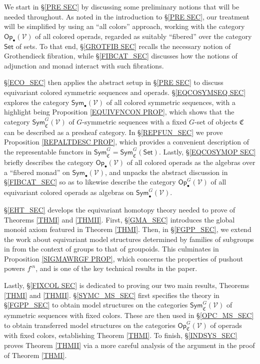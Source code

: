 \documentclass[a4paper,10pt
,draft
]{article}%
\numberwithin{equation}{section}
\numberwithin{figure}{section}
\theoremstyle{definition} %
\newcommand{\Op}{\mathsf{Op}}%
\newcommand{\V}{\ensuremath{\mathcal V}}
\newcommand{\1}{\ensuremath{\mathbbm 1}}%
\begin{document}
We start in \S \ref{PRE SEC} by discussing some preliminary notions that will be needed throughout.
As noted in the introduction to 
\S \ref{PRE SEC}, our treatment will be simplified by 
using an ``all colors'' approach,
working with the category $\Op_\bullet(\V)$ of all colored operads,
regarded as suitably ``fibered'' over the category $\mathsf{Set}$
of sets.
To that end, 
\S \ref{GROTFIB SEC} recalls the necessary
notion of Grothendieck fibration, 
while \S \ref{FIBCAT_SEC}
discusses how the notions of adjunction and monad 
interact with such fibrations.

\S \ref{ECO_SEC} then applies the abstract setup in \S \ref{PRE SEC}
to discuss equivariant colored symmetric sequences and operads. 
\S \ref{EQCOSYMSEQ SEC}
explores the category
$\mathsf{Sym}_{\bullet}(\V)$
of all colored symmetric sequences,
with a highlight being
Proposition \ref{EQUIVFNCON PROP},
which shows that the category
$\mathsf{Sym}^G_{\mathfrak{C}}(\V)$
of $G$-symmetric sequences with a fixed $G$-set of objects
$\mathfrak{C}$ can be described as a presheaf category.
In \S \ref{REPFUN_SEC} we prove
Proposition \ref{REPALTDESC PROP},
which provides a convenient description of the representable functors in 
$\mathsf{Sym}^G_{\mathfrak{C}} = \mathsf{Sym}^G_{\mathfrak{C}}(\mathsf{Set})$.
%
Lastly, \S \ref{EQCOSYMOP SEC}
briefly describes the category 
$\mathsf{Op}_{\bullet}(\V)$ 
of all colored operads as the algebras over a ``fibered monad''
on  
$\mathsf{Sym}_{\bullet}(\V)$,
and unpacks the abstract discussion in \S \ref{FIBCAT_SEC}
so as to likewise describe the category 
$\mathsf{Op}_{\bullet}^G(\V)$ 
of all equivariant colored operads
as algebras on 
$\mathsf{Sym}^G_{\bullet}(\V)$.


\S \ref{EHT_SEC} develops the equivariant homotopy theory
needed to prove of Theorems \ref{THMI} and \ref{THMII}.
First, \S \ref{GMA_SEC} introduces the global monoid axiom featured in Theorem \ref{THMI}.
Then, in \S \ref{FGPP_SEC}, 
we extend %
the work 
about equivariant model structures determined by families of subgroups in \cite[\S 6]{BP_geo}
from the context of groups to that of groupoids.
This culminates in 
Proposition \ref{SIGMAWRGF PROP},
which concerns the properties of pushout powers $f^{\square n}$,
and is one of the key technical results in the paper. %


Lastly, \S \ref{FIXCOL SEC}
is dedicated to proving our two main results, 
Theorems \ref{THMI} and \ref{THMII}.
%
\S \ref{SYMC_MS_SEC} first specifies the theory in
\S \ref{FGPP_SEC}
to obtain model structures on the categories
$\mathsf{Sym}^G_{\mathfrak{C}}(\V)$ of symmetric sequences with fixed colors.
These are then used in \S \ref{OPC_MS_SEC}
to obtain transferred model structures on the 
categories
$\mathsf{Op}^G_{\mathfrak{C}}(\V)$
of operads with fixed colors, establishing Theorem \ref{THMI}.
To finish, \S \ref{INDSYS_SEC} proves Theorem \ref{THMII}
via a more careful analysis of the argument in the proof of 
Theorem \ref{THMI}.
\end{document}
